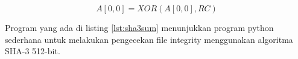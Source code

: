 \begin{equation}
  \label{eq:iota}
  A[0,0]=XOR(A[0,0], RC)
\end{equation}



Program yang ada di listing \ref{lst:sha3sum} menunjukkan program python sederhana untuk melakukan pengecekan file integrity menggunakan algoritma SHA-3 512-bit.


\lipsum[12]

